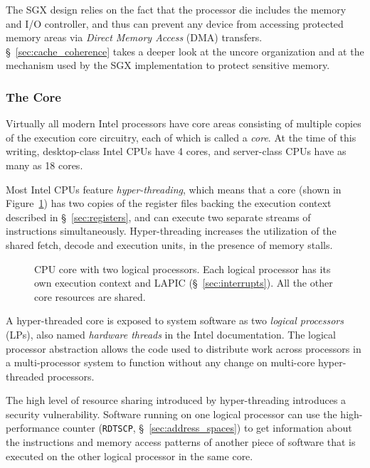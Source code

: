 The SGX design relies on the fact that the processor die includes the memory
and I/O controller, and thus can prevent any device from accessing protected
memory areas via \textit{Direct Memory Access} (DMA) transfers.
\S~\ref{sec:cache_coherence} takes a deeper look at the uncore organization and
at the mechanism used by the SGX implementation to protect sensitive memory.


\subsubsection{The Core}
\label{sec:cpu_core}

Virtually all modern Intel processors have core areas consisting of multiple
copies of the execution core circuitry, each of which is called a
\textit{core}.  At the time of this writing, desktop-class Intel CPUs have 4
cores, and server-class CPUs have as many as 18 cores.

Most Intel CPUs feature \textit{hyper-threading}, which means that a core
(shown in Figure~\ref{fig:cpu_core}) has two copies of the register files
backing the execution context described in \S~\ref{sec:registers}, and can
execute two separate streams of instructions simultaneously. Hyper-threading
increases the utilization of the shared fetch, decode and execution units, in
the presence of memory stalls.

\begin{figure}[hbt]
  \caption{
    CPU core with two logical processors. Each logical processor has its own
    execution context and LAPIC (\S~\ref{sec:interrupts}). All the other core
    resources are shared.
  }
  \label{fig:cpu_core}
\end{figure}

A hyper-threaded core is exposed to system software as two \textit{logical
processors} (LPs), also named \textit{hardware threads} in the Intel
documentation.  The logical processor abstraction allows the code used to
distribute work across processors in a multi-processor system to function
without any change on multi-core hyper-threaded processors.

The high level of resource sharing introduced by hyper-threading introduces a
security vulnerability. Software running on one logical processor can use the
high-performance counter (\texttt{RDTSCP}, \S~\ref{sec:address_spaces})
\cite{petters1999making} to get information about the instructions and memory
access patterns of another piece of software that is executed on the other
logical processor in the same core.
